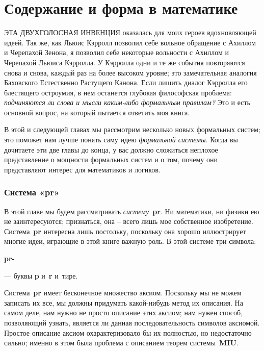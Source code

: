 \documentclass[../main.tex]{subfiles}
\begin{document}
\chapter{Содержание и форма в математике}

ЭТА ДВУХГОЛОСНАЯ ИНВЕНЦИЯ оказалась для моих героев вдохновляющей идеей. Так же, как Льюис Кэрролл позволил себе вольное обращение с Ахиллом и Черепахой Зенона, я позволил себе некоторые вольности с Ахиллом и Черепахой Льюиса Кэрролла. У Кэрролла одни и те же события повторяются снова и снова, каждый раз на более высоком уровне; это замечательная аналогия Баховского Естественно Растущего Канона. Если лишить диалог Кэрролла его блестящего остроумия, в нем останется глубокая философская проблема: \emph{подчиняются ли слова и мысли каким-либо формальным правилам?} Это и есть основной вопрос, на который пытается ответить моя книга.

В этой и следующей главах мы рассмотрим несколько новых формальных систем; это поможет нам лучше понять саму идею \emph{формальной системы}.
Когда вы дочитаете эти две главы до конца, у вас должно сложиться неплохое представление о мощности формальных систем и о том, почему они представляют интерес для математиков и логиков.


\subsection{Система «pr»}

В этой главе мы будем рассматривать \emph{систему}~\textbf{pr}.
Ни математики, ни физики ею не заинтересуются; признаться, она \--- всего лишь мое собственное изобретение.
Система~\textbf{pr} интересна лишь постольку, поскольку она хорошо иллюстрирует многие идеи, играющие в этой книге важную роль.
В этой системе три символа:
\begin{center}
    \large\bfseries
    p\quad r\quad -
\end{center}

--- буквы \textbf{p} и~\textbf{r} и~тире.

Система~\textbf{pr} имеет бесконечное множество аксиом.
Поскольку мы не можем записать их все, мы должны придумать какой-нибудь метод их описания.
На самом деле, нам нужно не просто описание этих аксиом; нам нужен способ, позволяющий узнать, является ли данная последовательность символов аксиомой.
Простое описание аксиом охарактеризовало бы их полностью, но недостаточно сильно; именно в этом была проблема с описанием теорем системы~\textbf{MIU}.
\end{document}
